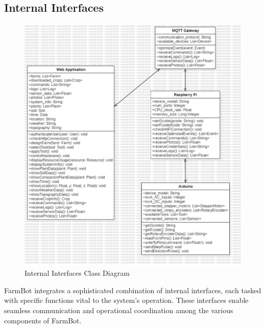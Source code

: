 \subsection{Internal Interfaces}
\begin{figure}[htbp]
    \centering
    \includegraphics[width=0.9\linewidth]{Figures/internal_interfaces.jpg}
    \caption{Internal Interfaces Class Diagram}
    \label{InternalInterfaces}
\end{figure}
\newpage
FarmBot integrates a sophisticated combination of internal interfaces, each tasked with specific functions vital to the system’s operation. These interfaces enable seamless communication and operational coordination among the various components of FarmBot.
